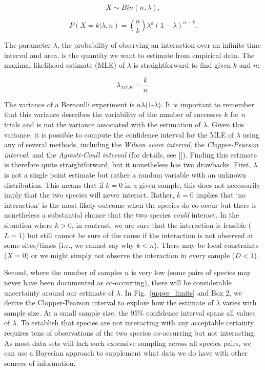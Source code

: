 \documentclass[12pt]{article}
\begin{document}
\begin{spacing}{2.0}
      \begin{equation}
        X \sim Bin(n,\lambda) ,
      \end{equation}


      \begin{equation}
         P(X = k|\lambda,n) = {n \choose k}\lambda^k(1-\lambda)^{n-k} . 
         \label{likelihood}
      \end{equation}

  \noindent The parameter $\lambda$, the probability of observing an interaction over an infinite time interval and area, is the quantity we want to estimate from empirical data. 
  The maximal likelihood estimate (MLE) of $\lambda$ is straightforward to find given $k$ and $n$:

      \begin{equation}
        \lambda_{MLE} = \frac{k}{n}  .
        \label{theta_MLE}
      \end{equation}

  The variance of a Bernoulli experiment is $n\lambda$(1-$\lambda$). It is important to remember that this variance describes the variability of the number of successes $k$ for $n$ trials and is not the variance associated with the estimation of $\lambda$. Given this variance, it is possible to compute the confidence interval for the MLE of $\lambda$ using any of several methods, including the \emph{Wilson score interval}, the \emph{Clopper-Pearson interval}, and the \emph{Agresti-Coull interval} (for details, see [\citealp{Brown2001}]). Finding this estimate is therefore quite straightforward, but it nonetheless has two drawbacks. First, $\lambda$ is not a single point estimate but rather a random variable with an unknown distribution. This means that if $k = 0$ in a given sample, this does not necessarily imply that the two species will never interact. Rather, $k = 0$ implies that `no interaction' is the most likely outcome when the species do co-occur but there is nonetheless a substantial chance that the two species \emph{could} interact. In the situation where $k>0$, in contrast, we are sure that the interaction is feasible ($L = 1$) but still cannot be sure of the cause if the interaction is not observed at some sites/times (i.e., we cannot say why $k<n$). There may be local constraints ($X=0$) or we might simply not observe the interaction in every sample ($D<1$). 


  Second, where the number of samples $n$ is very low (some pairs of species may never have been documented as co-occurring), there will be considerable uncertainty around our estimate of $\lambda$. In Fig.~\ref{upper_limits} and Box 2, we derive the Clopper-Pearson interval to explore how the estimate of $\lambda$ varies with sample size. At a small sample size, the 95\% confidence interval spans all values of $\lambda$. To establish that species are not interacting with any acceptable certainty requires tens of observations of the two species co-occurring but not interacting. As most data sets will lack such extensive sampling across all species pairs, we can use a Bayesian approach to supplement what data we do have with other sources of information.



\end{spacing}
\end{document}
